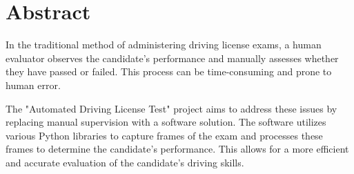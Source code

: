 



\KECcoverpage %
\KECtitlepage %




\chapter*{Abstract} %
In the traditional method of administering driving license exams, a human evaluator observes the candidate's performance and manually assesses whether they have passed or failed. This process can be time-consuming and prone to human error.

The "Automated Driving License Test" project aims to address these issues by replacing manual supervision with a software solution. The software utilizes various Python libraries to capture frames of the exam and processes these frames to determine the candidate's performance. This allows for a more efficient and accurate evaluation of the candidate's driving skills.

